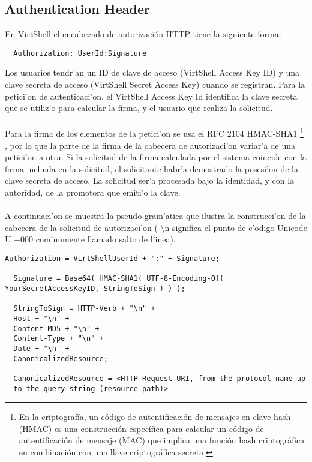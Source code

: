 \subsection{Authentication Header}

En VirtShell el encabezado de autorización HTTP tiene la siguiente forma:

\medskip
\begin{lstlisting}
  Authorization: UserId:Signature
\end{lstlisting}
\medskip

Los usuarios tendr'an un ID de clave de acceso (VirtShell Access Key ID) y una clave secreta de acceso (VirtShell Secret Access Key) cuando se registran. Para la petici'on de autenticaci'on, el VirtShell Access Key Id identifica la clave secreta que se utiliz'o para calcular la firma, y el usuario que realiza la solicitud.\\
\\
Para la firma de los elementos de la petici'on se usa el RFC 2104 HMAC-SHA1 \footnote{En la criptografía, un código de autentificación de mensajes en clave-hash (HMAC) es una construcción específica para calcular un código de autentificación de mensaje (MAC) que implica una función hash criptográfica en combinación con una llave criptográfica secreta.} \cite{rfc2104}, por lo que la parte de la firma de la cabecera de autorizaci'on variar'a de una petici'on a otra. Si la solicitud de la firma calculada por el sistema coincide con la firma incluida en la solicitud, el solicitante habr'a demostrado la posesi'on de la clave secreta de acceso. La solicitud ser'a procesada bajo la identidad, y con la autoridad, de la promotora que emiti'o la clave.\\
\\
A continuaci'on se muestra la pseudo-gram'atica que ilustra la construcci'on de la cabecera de la solicitud de autorizaci'on (
\textbackslash{}n significa el punto de c'odigo Unicode U +000 com'unmente llamado salto de l'inea).

\medskip
\begin{lstlisting}[style=json, caption=cabecera de una solicitud de autorización]
  Authorization = VirtShellUserId + ":" + Signature;

  Signature = Base64( HMAC-SHA1( UTF-8-Encoding-Of( YourSecretAccessKeyID, StringToSign ) ) );

  StringToSign = HTTP-Verb + "\n" +
  Host + "\n" +
  Content-MD5 + "\n" +
  Content-Type + "\n" +
  Date + "\n" +
  CanonicalizedResource;

  CanonicalizedResource = <HTTP-Request-URI, from the protocol name up 
  to the query string (resource path)>
\end{lstlisting}

